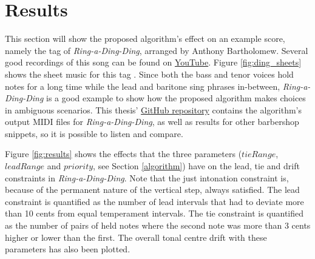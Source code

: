 \documentclass[a4paper]{article}
\begin{document}
\section{Results}
\label{results}

This section will show the proposed algorithm's effect on an example score, namely the tag of \textit{Ring-a-Ding-Ding}, arranged by Anthony Bartholomew. Several good recordings of this song can be found on \href{https://www.youtube.com/watch?v=G40I5JDtfjI&t=147s}{YouTube}. Figure \ref{fig:ding_sheets} shows the sheet music for this tag \cite{dominikschaller_barbershop_2015}. Since both the bass and tenor voices hold notes for a long time while the lead and baritone sing phrases in-between, \textit{Ring-a-Ding-Ding} is a good example to show how the proposed algorithm makes choices in ambiguous scenarios. This thesis' \href{https://github.com/teuncb/adaptivebarbershop}{GitHub repository} contains the algorithm's output MIDI files for \textit{Ring-a-Ding-Ding}, as well as results for other barbershop snippets, so it is possible to listen and compare.

Figure \ref{fig:results} shows the effects that the three parameters ($\mathit{tieRange}$, $\mathit{leadRange}$ and $\mathit{priority}$, see Section \ref{algorithm}) have on the lead, tie and drift constraints in \textit{Ring-a-Ding-Ding}. Note that the just intonation constraint is, because of the permanent nature of the vertical step, always satisfied. The lead constraint is quantified as the number of lead intervals that had to deviate more than 10 cents from equal temperament intervals. The tie constraint is quantified as the number of pairs of held notes where the second note was more than 3 cents higher or lower than the first. The overall tonal centre drift with these parameters has also been plotted.
\end{document}
